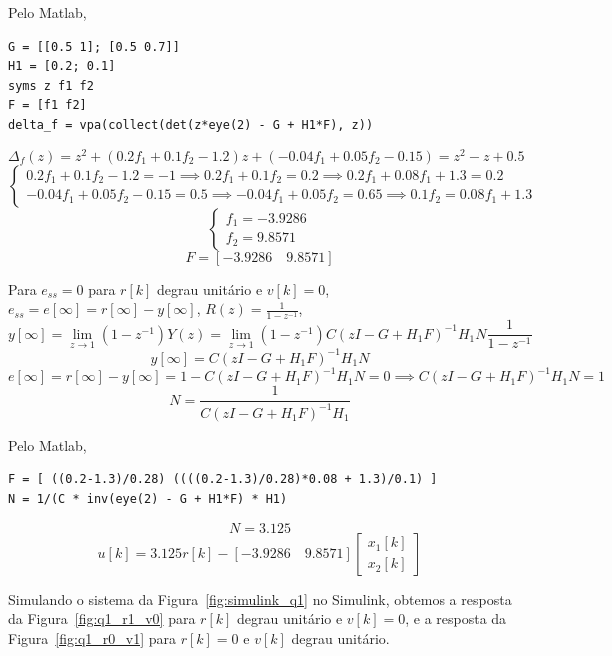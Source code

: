 \documentclass{article}
\begin{document}
    {Pelo Matlab,}
    \begin{lstlisting}
G = [[0.5 1]; [0.5 0.7]]
H1 = [0.2; 0.1]
syms z f1 f2
F = [f1 f2]
delta_f = vpa(collect(det(z*eye(2) - G + H1*F), z))
    \end{lstlisting}
    \[ \Delta_f(z) = z^2 + (0.2f_1 + 0.1f_2 - 1.2)z + (-0.04f_1 + 0.05f_2 -0.15)
        = z^2 -z +0.5
    \]
    \[  \begin{cases}
            0.2f_1 + 0.1f_2 - 1.2 = -1 \implies
                0.2f_1 +0.1f_2 = 0.2 \implies
                0.2f_1 +0.08f_1 + 1.3 = 0.2\\
            -0.04f_1 + 0.05f_2 -0.15 = 0.5 \implies
                -0.04f_1 + 0.05f_2 = 0.65 \implies
                0.1f_2 = 0.08f_1 +1.3
        \end{cases}
    \]
    \[  \begin{cases}
            f_1 = -3.9286\\
            f_2 = 9.8571
        \end{cases}
    \]
    \[ F = [-3.9286\quad 9.8571] \]

    {Para $e_{ss} = 0$ para $r[k]$ degrau unitário e $v[k] = 0$,
    $e_{ss} = e[\infty] = r[\infty] - y[\infty]$, $R(z) = \frac{1}{1-z^{-1}}$,}
    \[ y[\infty] = \lim\limits_{z \to 1} (1-z^{-1})Y(z)
        = \lim\limits_{z \to 1} (1-z^{-1})C (zI -G +H_1F)^{-1} H_1N \frac{1}{1-z^{-1}} \]
    \[ y[\infty] = C (zI -G +H_1F)^{-1} H_1N \]
    \[ e[\infty] = r[\infty] - y[\infty] = 1 - C (zI -G +H_1F)^{-1} H_1N = 0
        \implies C (zI -G +H_1F)^{-1} H_1N = 1
    \]
    \[ N = \frac{1}{C (zI -G +H_1F)^{-1} H_1} \]

    {Pelo Matlab,}
    \begin{lstlisting}
F = [ ((0.2-1.3)/0.28) ((((0.2-1.3)/0.28)*0.08 + 1.3)/0.1) ]
N = 1/(C * inv(eye(2) - G + H1*F) * H1)
    \end{lstlisting}
    \[ N = 3.125 \]
    \[ u[k] = 3.125r[k] - [-3.9286\quad 9.8571]
        \begin{bmatrix}
            x_1[k]\\
            x_2[k]
        \end{bmatrix}
    \]

    \clearpage
    {Simulando o sistema da Figura~\ref{fig:simulink_q1} no Simulink, obtemos a
    resposta da Figura~\ref{fig:q1_r1_v0} para $r[k]$ degrau unitário e $v[k]=0$,
    e a resposta da Figura~\ref{fig:q1_r0_v1} para $r[k]=0$ e $v[k]$ degrau unitário.}
\end{document}

